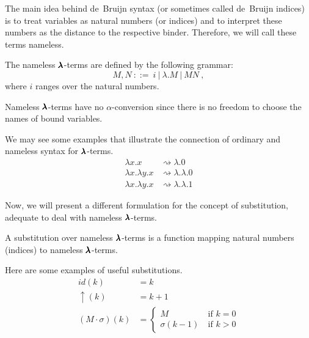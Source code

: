 The main idea behind de~Bruijn syntax (or sometimes called de~Bruijn indices) is to treat variables as natural numbers (or indices) and to interpret these numbers as the distance to the respective binder.
Therefore, we will call these terms nameless. 

\begin{definition}
  The nameless $\pmb{\lambda}$-terms are defined by the following grammar:
  \[ M, N \ ::= \ i \ | \ \lambda . M \ | \ M N \ , \]  
  where $i$ ranges over the natural numbers.
\end{definition}

\begin{remark}
  Nameless $\pmb{\lambda}$-terms have no $\alpha$-conversion since there is no freedom to choose the names of bound variables.
\end{remark}

We may see some examples that illustrate the connection of ordinary and nameless syntax for $\pmb{\lambda}$-terms.
\begin{align*}
  \lambda x . x &\rightsquigarrow \lambda . 0 \\
  \lambda x . \lambda y . x &\rightsquigarrow \lambda . \lambda . 0 \\
  \lambda x . \lambda y . x &\rightsquigarrow \lambda . \lambda . 1
\end{align*}

Now, we will present a different formulation for the concept of substitution, adequate to deal with nameless $\pmb{\lambda}$-terms.
\begin{definition}[Substitution]
  A substitution over nameless $\pmb{\lambda}$-terms is a function mapping natural numbers (indices) to nameless $\pmb{\lambda}$-terms.
\end{definition}

Here are some examples of useful substitutions.
\begin{align*}
  id(k) &= k \\
  \uparrow(k) &= k+1 \\
  (M \cdot \sigma)(k) &=
                        \begin{cases}
                          M & \ \text{if $k = 0$} \\
                          \sigma(k-1) & \ \text{if $k > 0$}
                        \end{cases}
\end{align*}

